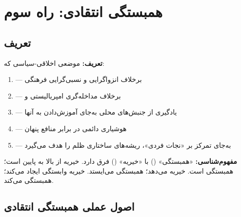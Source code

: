 \section{همبستگی انتقادی: راه سوم}
\label{sec:ch17-critical-solidarity}

\subsection{تعریف}

\begin{tcolorbox}[defbox, title={همبستگی انتقادی چیست؟}]
\textbf{تعریف:} موضعی اخلاقی-سیاسی که:

\begin{enumerate}
\item {} — برخلاف انزواگرایی و
  نسبی‌گرایی فرهنگی
\item {} — برخلاف مداخله‌گری
  امپریالیستی و 
\item {} — یادگیری از جنبش‌های محلی
  به‌جای آموزش‌دادن به آنها
\item {} — هوشیاری
  دائمی در برابر منافع پنهان
\item {} — به‌جای تمرکز بر «نجات فردی»، ریشه‌های
  ساختاری ظلم را هدف می‌گیرد
\end{enumerate}

\textbf{مفهوم‌شناسی:} «همبستگی» () با «خیریه»
() فرق دارد. خیریه از بالا به پایین است؛ همبستگی
 است. خیریه می‌دهد؛ همبستگی  می‌ایستد.
خیریه وابستگی ایجاد می‌کند؛ همبستگی  می‌کند.
\end{tcolorbox}


\subsection{اصول عملی همبستگی انتقادی}

